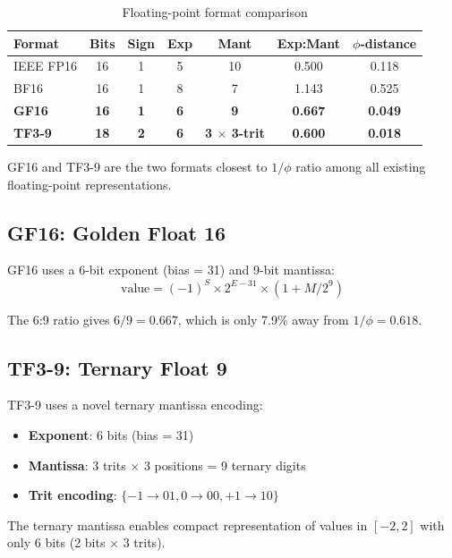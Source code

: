 \documentclass[10pt,conference]{IEEEtran}
\begin{document}
\begin{table}[t]
  \centering
  \caption{Floating-point format comparison}
  \label{tab:formats}
  \begin{tabular}{lcccccc}
    \toprule
    Format & Bits & Sign & Exp & Mant & Exp:Mant & $\phi$-distance \\
    \midrule
    IEEE FP16 & 16 & 1 & 5 & 10 & 0.500 & 0.118 \\
    BF16 & 16 & 1 & 8 & 7 & 1.143 & 0.525 \\
    \textbf{GF16} & \textbf{16} & \textbf{1} & \textbf{6} & \textbf{9} & \textbf{0.667} & \textbf{0.049} \\
    \textbf{TF3-9} & \textbf{18} & \textbf{2} & \textbf{6} & \textbf{3 $\times$ 3-trit} & \textbf{0.600} & \textbf{0.018} \\
    \bottomrule
  \end{tabular}
\end{table}

GF16 and TF3-9 are the two formats closest to $1/\phi$ ratio among all existing floating-point representations.

\subsection{GF16: Golden Float 16}

GF16 uses a 6-bit exponent (bias = 31) and 9-bit mantissa:
\begin{equation}
  \text{value} = (-1)^S \times 2^{E-31} \times (1 + M / 2^9)
\end{equation}

The 6:9 ratio gives $6/9 = 0.667$, which is only 7.9\% away from $1/\phi = 0.618$.

\subsection{TF3-9: Ternary Float 9}

TF3-9 uses a novel ternary mantissa encoding:
\begin{itemize}
  \item \textbf{Exponent}: 6 bits (bias = 31)
  \item \textbf{Mantissa}: 3 trits $\times$ 3 positions = 9 ternary digits
  \item \textbf{Trit encoding}: $\{-1 \to 01, 0 \to 00, +1 \to 10\}$
\end{itemize}

The ternary mantissa enables compact representation of values in $[-2, 2]$ with only 6 bits (2 bits $\times$ 3 trits).
\end{document}
